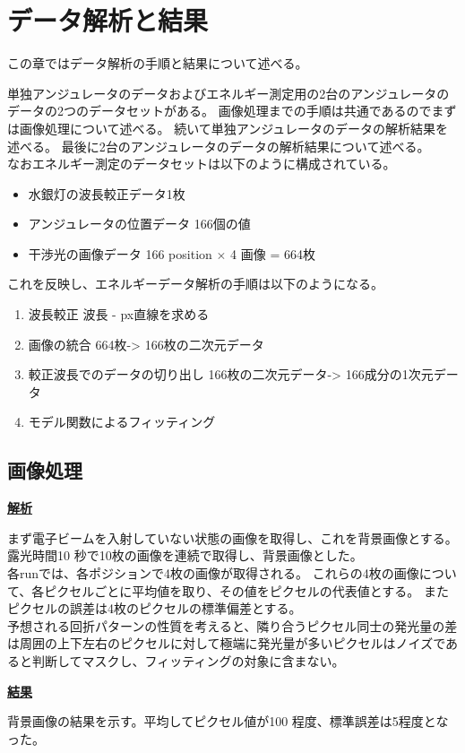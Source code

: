\documentclass[a4paper,11pt,uplatex]{jsbook}
\begin{document}
\chapter{データ解析と結果}
この章ではデータ解析の手順と結果について述べる。

単独アンジュレータのデータおよびエネルギー測定用の2台のアンジュレータのデータの2つのデータセットがある。
画像処理までの手順は共通であるのでまずは画像処理について述べる。
続いて単独アンジュレータのデータの解析結果を述べる。
最後に2台のアンジュレータのデータの解析結果について述べる。\\
なおエネルギー測定のデータセットは以下のように構成されている。
\begin{itemize}
  \item 水銀灯の波長較正データ1枚
  \item アンジュレータの位置データ 166個の値
  \item 干渉光の画像データ 166 position $\times$ 4 画像 = 664枚
\end{itemize}
これを反映し、エネルギーデータ解析の手順は以下のようになる。
\begin{enumerate}
  \item 波長較正 波長 - px直線を求める
  \item 画像の統合 664枚-> 166枚の二次元データ
  \item 較正波長でのデータの切り出し 166枚の二次元データ-> 166成分の1次元データ
  \item モデル関数によるフィッティング
\end{enumerate}

\section{画像処理}
\noindent \textbf{\underline{解析}}\par
まず電子ビームを入射していない状態の画像を取得し、これを背景画像とする。露光時間10 秒で10枚の画像を連続で取得し、背景画像とした。\\
各runでは、各ポジションで4枚の画像が取得される。
これらの4枚の画像について、各ピクセルごとに平均値を取り、その値をピクセルの代表値とする。
またピクセルの誤差は4枚のピクセルの標準偏差とする。\\
予想される回折パターンの性質を考えると、隣り合うピクセル同士の発光量の差は周囲の上下左右のピクセルに対して極端に発光量が多いピクセルはノイズであると判断してマスクし、フィッティングの対象に含まない。

\noindent \textbf{\underline{結果}}\par
背景画像の結果を示す。平均してピクセル値が100 程度、標準誤差は5程度となった。
\end{document}
